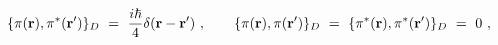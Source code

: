 \begin{equation}
\{\pi ({\bf r}),\pi ^{\ast }({\bf r^{\prime }})\}_{D}\ =\ {\frac{i\hbar }{4}%
}\delta ({\bf r}-{\bf r^{\prime }})\ ,\qquad \{\pi ({\bf r}),\pi ({\bf %
r^{\prime }})\}_{D}\ =\ \{\pi ^{\ast }({\bf r}),\pi ^{\ast }({\bf r^{\prime }%
})\}_{D}\ =\ 0\ ,  \label{DB2}
\end{equation}%
